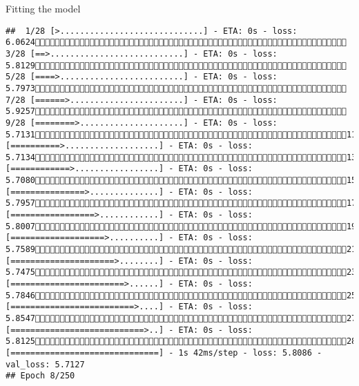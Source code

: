 \documentclass[
  ignorenonframetext,
]{beamer}
\begin{document}
\begin{frame}[fragile]{Fitting the model}
\begin{verbatim}
##  1/28 [>.............................] - ETA: 0s - loss: 6.0624 3/28 [==>...........................] - ETA: 0s - loss: 5.8129 5/28 [====>.........................] - ETA: 0s - loss: 5.7973 7/28 [======>.......................] - ETA: 0s - loss: 5.9257 9/28 [========>.....................] - ETA: 0s - loss: 5.713111/28 [==========>...................] - ETA: 0s - loss: 5.713413/28 [============>.................] - ETA: 0s - loss: 5.708015/28 [===============>..............] - ETA: 0s - loss: 5.795717/28 [=================>............] - ETA: 0s - loss: 5.800719/28 [===================>..........] - ETA: 0s - loss: 5.758921/28 [=====================>........] - ETA: 0s - loss: 5.747523/28 [=======================>......] - ETA: 0s - loss: 5.784625/28 [=========================>....] - ETA: 0s - loss: 5.854727/28 [===========================>..] - ETA: 0s - loss: 5.812528/28 [==============================] - 1s 42ms/step - loss: 5.8086 - val_loss: 5.7127
## Epoch 8/250

\end{verbatim}
\end{frame}
\end{document}
